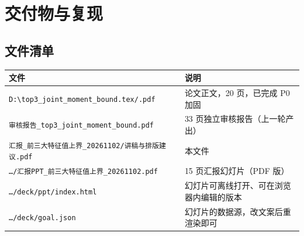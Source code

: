 \documentclass[UTF8,11pt]{ctexart}
\newcommand{\file}[1]{\texttt{#1}}
\begin{document}
\section{交付物与复现}

\subsection*{文件清单}
\begin{center}
\small
\begin{tabular}{@{}p{8.1cm}p{5.6cm}@{}}
\toprule
文件 & 说明 \\
\midrule
\file{D:\textbackslash top3\_joint\_moment\_bound.tex/.pdf} & 论文正文，20 页，已完成 P0 加固 \\
\file{审核报告\_top3\_joint\_moment\_bound.pdf} & 33 页独立审核报告（上一轮产出） \\
\file{汇报\_前三大特征值上界\_20261102/讲稿与排版建议.pdf} & 本文件 \\
\file{\ldots/汇报PPT\_前三大特征值上界\_20261102.pdf} & 15 页汇报幻灯片（PDF 版） \\
\file{\ldots/deck/ppt/index.html} & 幻灯片可离线打开、可在浏览器内编辑的版本 \\
\file{\ldots/deck/goal.json} & 幻灯片的数据源，改文案后重渲染即可 \\
\bottomrule
\end{tabular}
\end{center}
\end{document}
